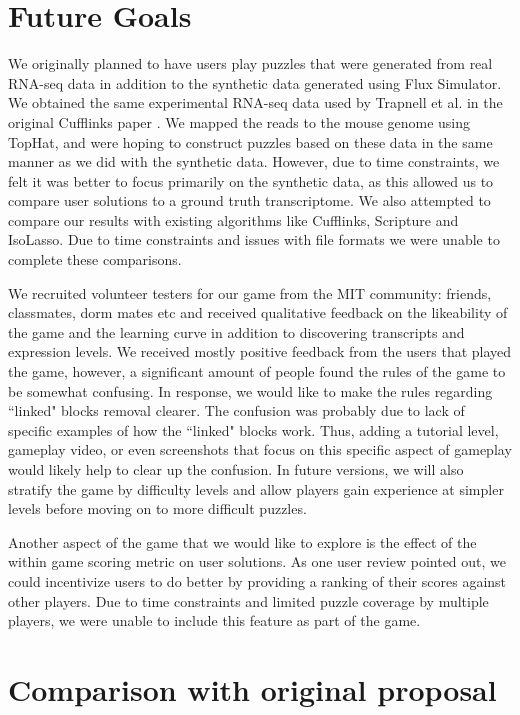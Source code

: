 \documentclass[12pt]{article}
\begin{document}
\section*{Future Goals}

We originally planned to have users play puzzles that were generated from real RNA-seq data in addition to the synthetic data generated using Flux Simulator.
We obtained the same experimental RNA-seq data used by Trapnell et al. in the original Cufflinks paper \citep{trapnell2010transcript}. We mapped the reads to 
the mouse genome using TopHat, and were hoping to construct puzzles based on these data in the same manner as we did with the synthetic data. However, due
to time constraints, we felt it was better to focus primarily on the synthetic data, as this allowed us to compare user solutions to a ground truth transcriptome. We also attempted to compare our results with existing algorithms like Cufflinks, Scripture and IsoLasso. Due to time constraints and issues with file formats we were unable to complete these comparisons.

We recruited volunteer testers for our game from the MIT community: friends, classmates, dorm mates etc and received qualitative feedback on the likeability of the game and the learning curve in addition to discovering transcripts and expression levels. We received mostly
positive feedback from the users that played the game, however, a significant amount of people found the rules of the game to be somewhat confusing. In response,
we would like to make the rules regarding ``linked" blocks removal clearer. The confusion was probably due to lack of specific examples of how the ``linked" blocks
work. Thus, adding a tutorial level, gameplay video, or even screenshots that focus on this specific aspect of gameplay would likely help to clear up the confusion. In future versions, we will also stratify the game by difficulty levels and allow players gain experience at simpler levels before moving on to more difficult puzzles. 

Another aspect of the game that we would like to explore is the effect of the within game scoring metric on user solutions. As one user review pointed out, we could incentivize users to do better by providing a ranking of their scores against other players. Due to time constraints and limited puzzle coverage by multiple players, we were unable to include this
feature as part of the game.

\section*{Comparison with original proposal}
\end{document}
